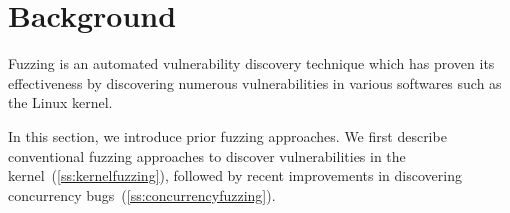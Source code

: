 \section{Background}
\label{s:background}

%

Fuzzing is an automated vulnerability discovery technique which has
proven its effectiveness by discovering numerous vulnerabilities in
various softwares such as the Linux kernel.

In this section, we introduce prior fuzzing approaches.
%
We first describe conventional fuzzing approaches to discover
vulnerabilities in the kernel~(\autoref{ss:kernelfuzzing}), followed
by recent improvements in discovering concurrency
bugs~(\autoref{ss:concurrencyfuzzing}).










